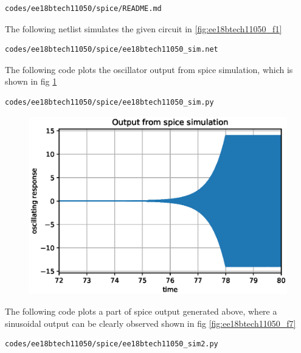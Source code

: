 \begin{enumerate}[label=\thesection.\arabic*.,ref=\thesection.\theenumi]
\begin{lstlisting}
codes/ee18btech11050/spice/README.md
\end{lstlisting}

The following netlist simulates the given circuit in \ref{fig:ee18btech11050_f1}

\begin{lstlisting}
codes/ee18btech11050/spice/ee18btech11050_sim.net
\end{lstlisting}

The following code plots the oscillator output from spice simulation, which is shown in fig \ref{fig:ee18btech11050_f6}

\begin{lstlisting}
codes/ee18btech11050/spice/ee18btech11050_sim.py
\end{lstlisting}

\begin{figure}[!ht]
\centering
\includegraphics[width=\columnwidth]{./figs/ee18btech11050/ee18btech11050_sim.eps}
\caption{}
\label{fig:ee18btech11050_f6}
\end{figure}

The following code plots a part of spice output generated above, where a sinusoidal output can be clearly observed shown in fig \ref{fig:ee18btech11050_f7}

\begin{lstlisting}
codes/ee18btech11050/spice/ee18btech11050_sim2.py
\end{lstlisting}


\end{enumerate}
